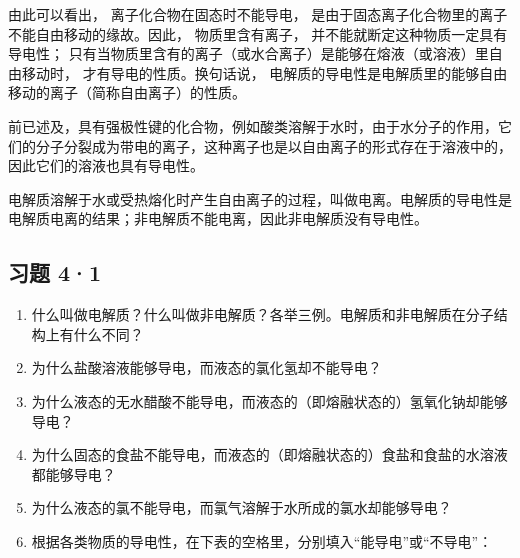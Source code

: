 由此可以看出， 离子化合物在固态时不能导电，
是由于固态离子化合物里的离子不能自由移动的缘故。因此， 物质里含有离子，
并不能就断定这种物质一定具有导电性；
只有当物质里含有的离子（或水合离子）是能够在熔液（或溶液）里自由移动时，
才有导电的性质。换句话说，
电解质的导电性是电解质里的能够自由移动的离子（简称自由离子）的性质。

前已述及，具有强极性键的化合物，例如酸类溶解于水时，由于水分子的作用，它们的分子分裂成为带电的离子，这种离子也是以自由离子的形式存在于溶液中的，因此它们的溶液也具有导电性。

电解质溶解于水或受热熔化时产生自由离子的过程，叫做电离。电解质的导电性是电解质电离的结果；非电解质不能电离，因此非电解质没有导电性。

\subsection{习题 4·1}

\begin{enumerate}
\item
  什么叫做电解质？什么叫做非电解质？各举三例。电解质和非电解质在分子结构上有什么不同？
\item
  为什么盐酸溶液能够导电，而液态的氯化氢却不能导电？
\item
  为什么液态的无水醋酸不能导电，而液态的（即熔融状态的）氢氧化钠却能够导电？
\item
  为什么固态的食盐不能导电，而液态的（即熔融状态的）食盐和食盐的水溶液都能够导电？
\item
  为什么液态的氯不能导电，而氯气溶解于水所成的氯水却能够导电？
\item
  根据各类物质的导电性，在下表的空格里，分别填入``能导电''或``不导电''：
\end{enumerate}

